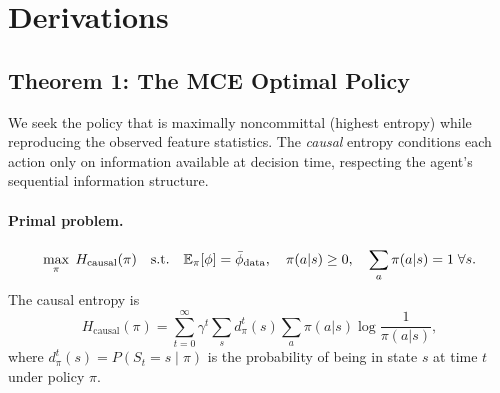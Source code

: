 \documentclass[10pt]{article}
\begin{document}
\section{Derivations}

\subsection{Theorem 1: The MCE Optimal Policy}

We seek the policy that is maximally noncommittal (highest entropy) while reproducing the observed feature statistics. The \emph{causal} entropy conditions each action only on information available at decision time, respecting the agent's sequential information structure.

\paragraph{Primal problem.}
\begin{equation}
\label{eq:primal}
\max_{\pi} \; H_{\text{causal}}(\pi) \quad \text{s.t.} \quad \mathbb{E}_\pi[\phi] = \bar\phi_{\text{data}}, \quad \pi(a|s) \geq 0, \quad \sum_a \pi(a|s) = 1 \;\forall s.
\end{equation}
The causal entropy is
\begin{equation}
H_{\text{causal}}(\pi) = \sum_{t=0}^{\infty} \gamma^t \sum_{s} d_\pi^t(s) \sum_{a} \pi(a|s) \log \frac{1}{\pi(a|s)},
\end{equation}
where $d_\pi^t(s) = P(S_t = s \mid \pi)$ is the probability of being in state $s$ at time $t$ under policy $\pi$.
\end{document}
